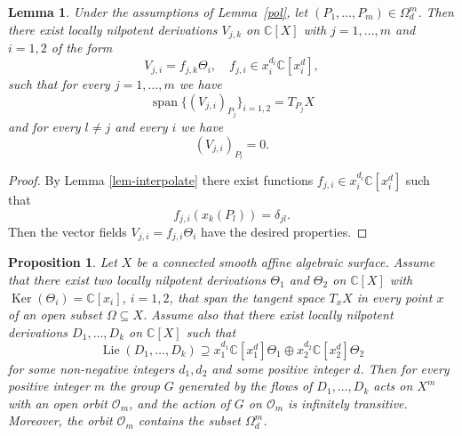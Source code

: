 \documentclass[a4paper,draft,reqno,12pt]{amsart}
\newtheorem{proposition}[theorem]{Proposition}
\newtheorem{lemma}[theorem]{Lemma}
\theoremstyle{definition}
\theoremstyle{remark}
\DeclareMathOperator{\lie}{Lie}
\DeclareMathOperator{\Ker}{Ker}
\def\CC{{\mathbb C}}
\def\OOO{\mathcal{O}}
\begin{document}
\begin{lemma}
\label{lem-vf-spanning}
Under the assumptions of Lemma~\ref{pol}, let $(P_1, \dots, P_m)\in\Omega^m_d$.  Then there exist locally nilpotent derivations $V_{j,k}$ on $\CC[X]$ with $j =1,\ldots, m$ and $i =1, 2$
of the form
$$
V_{j,i} = f_{j,k} \Theta_i, \quad f_{j,i} \in x_i^{d_i} \CC[x_i^d],
$$
such that for every $j =1,\ldots, m$ we have  
$$
\mathop{\mathrm{span}} \{ (V_{j,i})_{P_j} \}_{i=1,2} = T_{P_j} X
$$
and for every $l \neq j$ and every $i$ we have
$$
(V_{j,i})_{P_l} = 0.
$$
\end{lemma}
\begin{proof}
By Lemma \ref{lem-interpolate} there exist functions $f_{j,i} \in x_i^{d_i} \CC[x_i^d]$ such that
$$
f_{j,i}(x_k(P_l)) = \delta_{j l}.
$$
Then the vector fields $V_{j,i} = f_{j,i} \Theta_i$ have the desired properties. 	
\end{proof}

\begin{proposition} \label{pimp}
Let $X$ be a connected smooth affine algebraic surface. Assume that there exist two locally nilpotent derivations $\Theta_1$ and $\Theta_2$ on $\CC[X]$ with $\Ker(\Theta_i)=\CC[x_i]$, 
$i=1,2$, that span the tangent space $T_xX$ in every point $x$ of an open subset $\Omega\subseteq X$. Assume also that there exist locally nilpotent derivations $D_1,\ldots,D_k$ on
$\CC[X]$ such that 
$$
\lie(D_1,\ldots,D_k)\supseteq x_1^{d_1}\CC[x_1^d]\Theta_1\oplus x_2^{d_2}\CC[x_2^d]\Theta_2
$$
for some non-negative integers $d_1,d_2$ and some positive integer $d$. 
Then for every positive integer $m$ the group $G$ generated by the flows of  $D_1,\ldots,D_k$ acts on $X^m$ with an open orbit $\OOO_m$, and the action of $G$ on $\OOO_m$ is infinitely transitive. Moreover, the orbit $\OOO_m$  contains the subset $\Omega^m_d$. 
\end{proposition}
\end{document}
